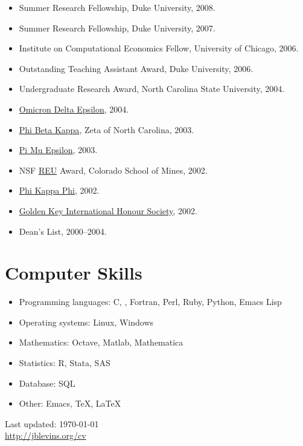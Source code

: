 \documentclass[overlapped,line,letterpaper]{res}
\begin{document}
\begin{resume}
\begin{itemize}
\item Summer Research Fellowship, Duke University, 2008.
\item Summer Research Fellowship, Duke University, 2007.
\item Institute on Computational Economics Fellow, University of Chicago, 2006.
\item Outstanding Teaching Assistant Award, Duke University, 2006.
\item Undergraduate Research Award, North Carolina State University, 2004.
\item \href{http://www.cba.ua.edu/~ode/}{Omicron Delta Epsilon}, 2004.
\item \href{http://www.pbk.org/}{Phi Beta Kappa}, Zeta of North Carolina, 2003.
\item \href{http://www.pme-math.org/}{Pi Mu Epsilon}, 2003.
\item NSF \href{http://www.nsf.gov/crssprgm/reu/}{REU} Award,
  Colorado School of Mines, 2002.
\item \href{http://www.phikappaphi.org/}{Phi Kappa Phi}, 2002.
\item \href{http://www.goldenkey.org}{Golden Key International
    Honour Society}, 2002.
\item Dean's List, 2000--2004.
\end{itemize}

\section{\bf Computer Skills}

\begin{itemize}
\item Programming languages: C, \Cplusplus, Fortran, Perl, Ruby, Python,
  Emacs Lisp
\item Operating systems: Linux, Windows
\item Mathematics: Octave, Matlab, Mathematica
\item Statistics: R, Stata, SAS
\item Database: SQL
\item Other: Emacs, \TeX, \LaTeX
\end{itemize}


\bigskip
\begin{center}
\begin{footnotesize}
Last updated: \today \\
\href{http://jblevins.org/cv}{http://jblevins.org/cv}
\end{footnotesize}
\end{center}

\end{resume}
\end{document}
